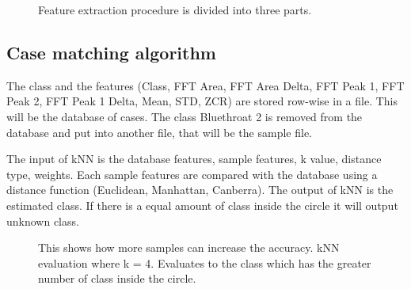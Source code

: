 \begin{figure}[htp]




    \caption{Feature extraction procedure is divided into three parts.}
    \label{fig:featureExtraction}
\end{figure}



\subsection{Case matching algorithm}
The class and the features
(Class, FFT Area, FFT Area Delta, FFT Peak 1, FFT Peak 2, FFT Peak 1 Delta, Mean, STD, ZCR)
are stored row-wise in a file. This will be the database of cases.
The class Bluethroat 2 is removed from the database and put into another file, that will be the sample file.

The input of kNN is the database features, sample features, k value, distance type, weights.
Each sample features are compared with the database using a distance function (Euclidean, Manhattan, Canberra).
The output of kNN is the estimated class.
If there is a equal amount of class inside the circle it will output unknown class.

\begin{figure}[htp]


    \caption{This shows how more samples can increase the accuracy. kNN evaluation where k = 4. Evaluates to the class which has the greater number of class inside the circle.}
    \label{fig:featureExtraction}
\end{figure}
